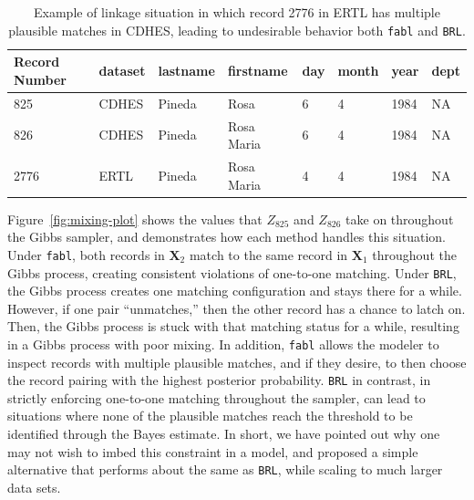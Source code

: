 \documentclass[12pt,letterpaper]{article}
\newcommand{\1}[1]{\mathbb{I}\!\left[#1\right]} %
\begin{document}
\begin{table}
	\centering
	\begin{tabular}[h!]{llllllll}
		\hline
		Record Number & dataset & lastname & firstname & day & month & year & dept \\
		\hline
		825 & CDHES & Pineda & Rosa & 6 & 4 & 1984 & NA\\
		\hline
		826 & CDHES & Pineda & Rosa Maria & 6 & 4 & 1984 & NA\\
		\hline
		2776 & ERTL & Pineda & Rosa Maria & 4 & 4 & 1984 & NA\\
		\hline
	\end{tabular}
	\caption{Example of linkage situation in which record 2776 in ERTL has multiple plausible matches in CDHES, leading to undesirable behavior both \texttt{fabl} and \texttt{BRL}.} \label{Tab:rosa_maria}
\end{table}

Figure~\ref{fig:mixing-plot} shows the values that \(Z_{825}\) and \(Z_{826}\) take on
throughout the Gibbs sampler, and demonstrates how each method handles
this situation. Under \texttt{fabl}, both records in \(\bm{X}_2\) match to the
same record in \(\bm{X}_1\) throughout the Gibbs process, creating consistent
violations of one-to-one matching. Under \texttt{BRL}, the Gibbs process
creates one matching configuration and stays there for a while. However, if
one pair ``unmatches,'' then the other record has a chance to latch on.
Then, the Gibbs process is stuck with that matching status for a while,
resulting in a Gibbs process with poor mixing. In addition,
\texttt{fabl} allows the modeler to inspect records with multiple
plausible matches, and if they desire, to then choose the record pairing
with the highest posterior probability. \texttt{BRL} in contrast, in
strictly enforcing one-to-one matching throughout the sampler, can lead
to situations where none of the plausible matches reach the threshold to
be identified through the Bayes estimate. In short, we have pointed out why one may not wish to imbed this constraint in a model, and proposed a simple alternative that performs about the same as \texttt{BRL}, while scaling to much larger data sets. 
\end{document}

